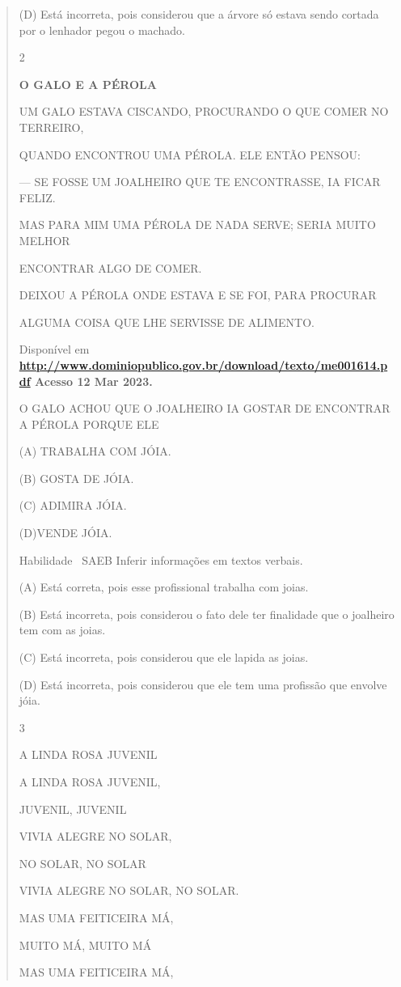 \begin{verse}
{{(D) Está incorreta, pois considerou que a árvore só estava sendo cortada
por o lenhador pegou o machado.

\num{2}

\textbf{O GALO E A PÉROLA}

UM GALO ESTAVA CISCANDO, PROCURANDO O QUE COMER NO TERREIRO,

QUANDO ENCONTROU UMA PÉROLA. ELE ENTÃO PENSOU:

--- SE FOSSE UM JOALHEIRO QUE TE ENCONTRASSE, IA FICAR FELIZ.

MAS PARA MIM UMA PÉROLA DE NADA SERVE; SERIA MUITO MELHOR

ENCONTRAR ALGO DE COMER.

DEIXOU A PÉROLA ONDE ESTAVA E SE FOI, PARA PROCURAR

ALGUMA COISA QUE LHE SERVISSE DE ALIMENTO.

Disponível em
\textbf{\url{http://www.dominiopublico.gov.br/download/texto/me001614.pdf}
Acesso 12 Mar 2023.}

O GALO ACHOU QUE O JOALHEIRO IA GOSTAR DE ENCONTRAR A PÉROLA PORQUE ELE

(A) TRABALHA COM JÓIA.

(B) GOSTA DE JÓIA.

(C) ADIMIRA JÓIA.

(D)VENDE JÓIA.

\protect\hypertarget{_Hlk129237824}{}{}Habilidade ~SAEB Inferir
informações em textos verbais.

\protect\hypertarget{_Hlk129241484}{}{}(A) Está correta, pois esse
profissional trabalha com joias.

(B) Está incorreta, pois considerou o fato dele ter finalidade que o
joalheiro tem com as joias.

(C) Está incorreta, pois considerou que ele lapida as joias.

(D) Está incorreta, pois considerou que ele tem uma profissão que
envolve jóia.

\num{3}

A LINDA ROSA JUVENIL

A LINDA ROSA JUVENIL,

JUVENIL, JUVENIL

VIVIA ALEGRE NO SOLAR,

NO SOLAR, NO SOLAR

VIVIA ALEGRE NO SOLAR, NO SOLAR.

MAS UMA FEITICEIRA MÁ,

MUITO MÁ, MUITO MÁ

MAS UMA FEITICEIRA MÁ,

}}
\end{verse}
